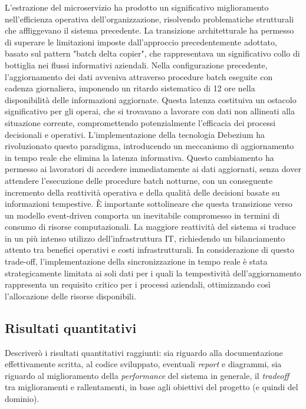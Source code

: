         L'estrazione del microservizio ha prodotto un significativo miglioramento nell'efficienza operativa dell'organizzazione, risolvendo problematiche strutturali che affliggevano il sistema precedente. La transizione architetturale ha permesso di superare le limitazioni imposte dall'approccio precedentemente adottato, basato sul pattern "batch delta copier", che rappresentava un significativo collo di bottiglia nei flussi informativi aziendali.
Nella configurazione precedente, l'aggiornamento dei dati avveniva attraverso procedure batch eseguite con cadenza giornaliera, imponendo un ritardo sistematico di 12 ore nella disponibilità delle informazioni aggiornate. Questa latenza costituiva un ostacolo significativo per gli operai, che si trovavano a lavorare con dati non allineati alla situazione corrente, compromettendo potenzialmente l'efficacia dei processi decisionali e operativi.
L'implementazione della tecnologia Debezium ha rivoluzionato questo paradigma, introducendo un meccanismo di aggiornamento in tempo reale che elimina la latenza informativa. Questo cambiamento ha permesso ai lavoratori di accedere immediatamente ai dati aggiornati, senza dover attendere l'esecuzione delle procedure batch notturne, con un conseguente incremento della reattività operativa e della qualità delle decisioni basate su informazioni tempestive.
È importante sottolineare che questa transizione verso un modello event-driven comporta un inevitabile compromesso in termini di consumo di risorse computazionali. La maggiore reattività del sistema si traduce in un più intenso utilizzo dell'infrastruttura IT, richiedendo un bilanciamento attento tra benefici operativi e costi infrastrutturali. In considerazione di questo trade-off, l'implementazione della sincronizzazione in tempo reale è stata strategicamente limitata ai soli dati per i quali la tempestività dell'aggiornamento rappresenta un requisito critico per i processi aziendali, ottimizzando così l'allocazione delle risorse disponibili.

        
        \subsection{Risultati quantitativi}
        Descriverò i risultati quantitativi raggiunti: sia riguardo alla documentazione effettivamente scritta, al codice sviluppato, eventuali \textit{report} e diagrammi, sia riguardo al miglioramento della \textit{performance} del sistema in generale, il \textit{tradeoff} tra miglioramenti e rallentamenti, in base agli obiettivi del progetto (e quindi del dominio).

